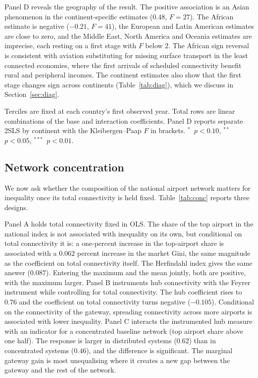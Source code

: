 \documentclass[12pt]{article}
\newcommand{\sym}[1]{\ensuremath{^{#1}}}
\begin{document}
Panel D reveals the geography of the result. The positive association is an Asian phenomenon in the continent-specific estimates ($0.48$, $F=27$). The African estimate is negative ($-0.21$, $F=41$), the European and Latin American estimates are close to zero, and the Middle East, North America and Oceania estimates are imprecise, each resting on a first stage with $F$ below $2$. The African sign reversal is consistent with aviation substituting for missing surface transport in the least connected economies, where the first arrivals of scheduled connectivity benefit rural and peripheral incomes. The continent estimates also show that the first stage changes sign across continents (Table~\ref{tab:diag}), which we discuss in Section~\ref{sec:diag}.

\begin{table}[H]\centering\caption{Heterogeneity: interaction 2SLS with the Feyrer instrument (robust SE).}\label{tab:hetero}
\begin{threeparttable}\small
\begin{tablenotes}\footnotesize\item Terciles are fixed at each country's first observed year. Total rows are linear combinations of the base and interaction coefficients. Panel D reports separate 2SLS by continent with the Kleibergen--Paap $F$ in brackets. \sym{*}~$p<0.10$, \sym{**}~$p<0.05$, \sym{***}~$p<0.01$.\end{tablenotes}\end{threeparttable}\end{table}

\subsection{Network concentration}
\label{sec:conc}
We now ask whether the composition of the national airport network matters for inequality once its total connectivity is held fixed. Table~\ref{tab:conc} reports three designs.

Panel A holds total connectivity fixed in OLS. The share of the top airport in the national index is not associated with inequality on its own, but conditional on total connectivity it is: a one-percent increase in the top-airport share is associated with a $0.062$ percent increase in the market Gini, the same magnitude as the coefficient on total connectivity itself. The Herfindahl index gives the same answer ($0.087$). Entering the maximum and the mean jointly, both are positive, with the maximum larger. Panel B instruments hub connectivity with the Feyrer instrument while controlling for total connectivity. The hub coefficient rises to $0.76$ and the coefficient on total connectivity turns negative ($-0.105$). Conditional on the connectivity of the gateway, spreading connectivity across more airports is associated with lower inequality. Panel C interacts the instrumented hub measure with an indicator for a concentrated baseline network (top airport share above one half). The response is larger in distributed systems ($0.62$) than in concentrated systems ($0.46$), and the difference is significant. The marginal gateway gain is most unequalising where it creates a new gap between the gateway and the rest of the network.
\end{document}
